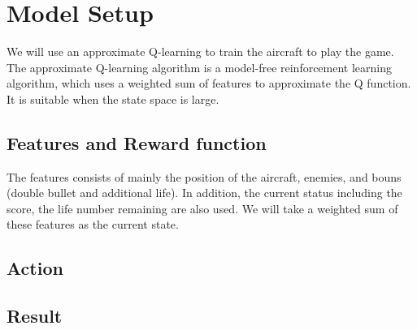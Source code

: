 \documentclass{article}
\begin{document}
\section{Model Setup}


    We will use an approximate Q-learning to train the aircraft to play the game. The approximate Q-learning algorithm is a model-free reinforcement learning algorithm, which uses a weighted sum of features to approximate the Q function. It is suitable when the state space is large. 

    \subsection{Features and Reward function}

    The features consists of mainly the position of the aircraft, enemies, and bouns (double bullet and additional life). In addition, the current status including the score, the life number remaining are also used. We will take a weighted sum of these features as the current state.


    \subsection{Action}



\subsection{Result}

\appendix
\end{document}
